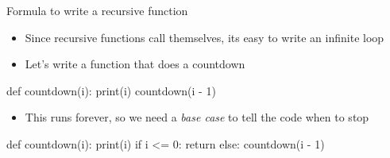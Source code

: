 \documentclass[
  ignorenonframetext,
]{beamer}
\newenvironment{Shaded}{\begin{snugshade}}{\end{snugshade}}
\newcommand{\BuiltInTok}[1]{\textcolor[rgb]{0.00,0.23,0.31}{#1}}
\newcommand{\ControlFlowTok}[1]{\textcolor[rgb]{0.00,0.23,0.31}{#1}}
\newcommand{\DecValTok}[1]{\textcolor[rgb]{0.68,0.00,0.00}{#1}}
\newcommand{\KeywordTok}[1]{\textcolor[rgb]{0.00,0.23,0.31}{#1}}
\newcommand{\NormalTok}[1]{\textcolor[rgb]{0.00,0.23,0.31}{#1}}
\newcommand{\OperatorTok}[1]{\textcolor[rgb]{0.37,0.37,0.37}{#1}}
\providecommand{\tightlist}{%
  \setlength{\itemsep}{0pt}\setlength{\parskip}{0pt}}\usepackage{longtable,booktabs,array}
\begin{document}
\begin{frame}[fragile]{Formula to write a recursive function}
\protect\hypertarget{formula-to-write-a-recursive-function}{}
\begin{itemize}
\item
  Since recursive functions call themselves, its easy to write an
  infinite loop
\item
  Let's write a function that does a countdown
\end{itemize}

\begin{Shaded}
\begin{Highlighting}[]
\KeywordTok{def}\NormalTok{ countdown(i):}
  \BuiltInTok{print}\NormalTok{(i)}
\NormalTok{  countdown(i }\OperatorTok{{-}} \DecValTok{1}\NormalTok{)}
\end{Highlighting}
\end{Shaded}

\begin{itemize}
\tightlist
\item
  This runs forever, so we need a \emph{base case} to tell the code when
  to stop
\end{itemize}

\begin{Shaded}
\begin{Highlighting}[]
\KeywordTok{def}\NormalTok{ countdown(i):}
  \BuiltInTok{print}\NormalTok{(i)}
  \ControlFlowTok{if}\NormalTok{ i }\OperatorTok{\textless{}=} \DecValTok{0}\NormalTok{:}
    \ControlFlowTok{return} 
  \ControlFlowTok{else}\NormalTok{:}
\NormalTok{    countdown(i }\OperatorTok{{-}} \DecValTok{1}\NormalTok{)}
\end{Highlighting}
\end{Shaded}
\end{frame}
\end{document}
